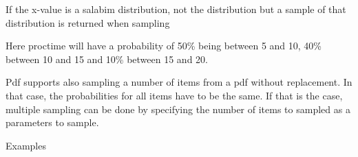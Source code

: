 \documentclass[letterpaper,10pt,english]{sphinxmanual}
\begin{document}
\begin{sphinxVerbatim}[commandchars=\\\{\}]
       
  
\end{sphinxVerbatim}

If the x-value is a salabim distribution, not the distribution but a sample of that distribution is returned when sampling

\begin{sphinxVerbatim}[commandchars=\\\{\}]
          
\end{sphinxVerbatim}

Here proctime will have a probability of 50\% being between 5 and 10, 40\% between 10 and 15 and 10\% between 15 and 20.

Pdf supports also sampling a number of items from a pdf without replacement. In that case, the probabilities for
all items have to be the same. If that is the case, multiple sampling can be done by specifying the number of items to
sampled as a parameters to sample.

Examples
\end{document}
